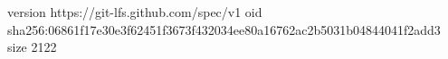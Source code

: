 version https://git-lfs.github.com/spec/v1
oid sha256:06861f17e30e3f62451f3673f432034ee80a16762ac2b5031b04844041f2add3
size 2122
